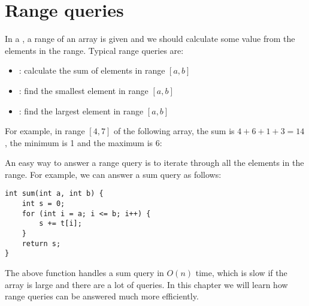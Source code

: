 \chapter{Range queries}


In a , a range of an array
is given and we should calculate some value from the
elements in the range. Typical range queries are:
\begin{itemize}
\item {}: calculate the sum of elements in range $[a,b]$
\item {}: find the smallest element in range $[a,b]$
\item {}: find the largest element in range $[a,b]$
\end{itemize}
For example, in range $[4,7]$ of the following array,
the sum is $4+6+1+3=14$, the minimum is 1 and the maximum is 6:
\begin{center}
\end{center}

An easy way to answer a range query is
to iterate through all the elements in the range.
For example, we can answer a sum query as follows:

\begin{lstlisting}
int sum(int a, int b) {
    int s = 0;
    for (int i = a; i <= b; i++) {
        s += t[i];
    }
    return s;
}
\end{lstlisting}

The above function handles a sum query
in $O(n)$ time, which is slow if the array is large
and there are a lot of queries.
In this chapter we will learn how
range queries can be answered much more efficiently.

